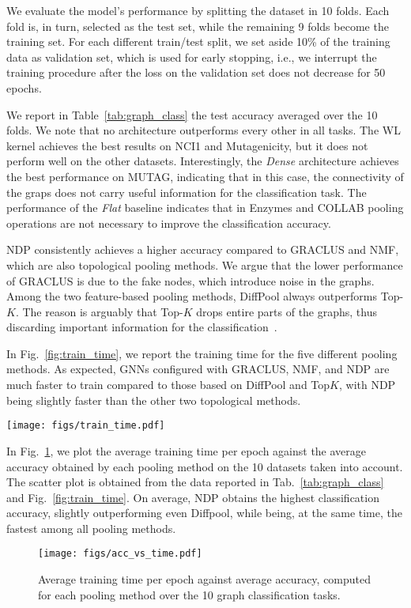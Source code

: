 \documentclass[journal]{IEEEtran}
\begin{document}
We evaluate the model's performance by splitting the dataset in 10 folds. 
Each fold is, in turn, selected as the test set, while the remaining 9 folds become the training set.
For each different train/test split, we set aside 10\% of the training data as validation set, which is used for early stopping, i.e., we interrupt the training procedure after the loss on the validation set does not decrease for 50 epochs.

We report in Table~\ref{tab:graph_class} the test accuracy averaged over the 10 folds.
We note that no architecture outperforms every other in all tasks.
The WL kernel achieves the best results on NCI1 and Mutagenicity, but it does not perform well on the other datasets.
Interestingly, the \textit{Dense} architecture achieves the best performance on MUTAG, indicating that in this case, the connectivity of the graps does not carry useful information for the classification task.
The performance of the \textit{Flat} baseline indicates that in Enzymes and COLLAB pooling operations are not necessary to improve the classification accuracy.

NDP consistently achieves a higher accuracy compared to GRACLUS and NMF, which are also topological pooling methods.
We argue that the lower performance of GRACLUS is due to the fake nodes, which introduce noise in the graphs.
Among the two feature-based pooling methods, DiffPool always outperforms Top-$K$.
The reason is arguably that Top-$K$ drops entire parts of the graphs, thus discarding important information for the classification~\cite{knyazev2019understanding, icml2020_1614}.

In Fig.~\ref{fig:train_time}, we report the training time for the five different pooling methods.
As expected, GNNs configured with GRACLUS, NMF, and NDP are much faster to train compared to those based on DiffPool and Top$K$, with NDP being slightly faster than the other two topological methods.
\begin{figure*}
    \centering
    \texttt{[image: figs/train\_time.pdf]}    
\caption{Average training time per epoch (in seconds) for different pooling methods. The bars height is in logarithmic scale. Simulations were performed with an Nvidia RTX 2080 Ti.}
    \label{fig:train_time}
\end{figure*}
In Fig.~\ref{fig:acc_vs_time}, we plot the average training time per epoch against the average accuracy obtained by each pooling method on the 10 datasets taken into account. 
The scatter plot is obtained from the data reported in Tab.~\ref{tab:graph_class} and Fig.~\ref{fig:train_time}.
On average, NDP obtains the highest classification accuracy, slightly outperforming even Diffpool, while being, at the same time, the fastest among all pooling methods.
\begin{figure}
    \centering
    \texttt{[image: figs/acc\_vs\_time.pdf]}    
\caption{Average training time per epoch against average accuracy, computed for each pooling method over the 10 graph classification tasks.}
    \label{fig:acc_vs_time}
\end{figure}
\end{document}
